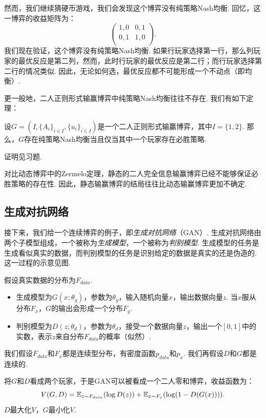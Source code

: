 然而，我们继续猜硬币游戏，我们会发现这个博弈没有纯策略Nash均衡. 回忆，这一博弈的收益矩阵为：
    \[
    \begin{pmatrix}
    1,0&0,1\\
    0,1&1,0\\
    \end{pmatrix}.
    \]
我们现在验证，这个博弈没有纯策略Nash均衡. 如果行玩家选择第一行，那么列玩家的最优反应是第二列，然而，此时行玩家的最优反应是第二行；而行玩家选择第二行的情况类似. 因此，无论如何选，最优反应都不可能形成一个不动点（即均衡）.

更一般地，二人正则形式输赢博弈中纯策略Nash均衡往往不存在. 我们有如下定理：
\begin{theorem}
设$G=(I,\{A_i\}_{i\in I}, \{u_i\}_{i\in I})$是一个二人正则形式输赢博弈，其中$I=\{1,2\}$. 那么，$G$存在纯策略Nash均衡当且仅当其中一个玩家存在必胜策略. %
\end{theorem}
证明见习题.

对比动态博弈中的Zermelo定理，静态的二人完全信息输赢博弈已经不能够保证必胜策略的存在性. 因此，静态输赢博弈的结局往往比动态输赢博弈更加不确定.


\subsection{生成对抗网络}

接下来，我们给一个连续博弈的例子，即\textit{生成对抗网络}（GAN）. 生成对抗网络由两个子模型组成，一个被称为\textit{生成模型}，一个被称为\textit{判别模型}. 生成模型的任务是生成看似真实的数据，而判别模型的任务是识别给定的数据是真实的还是伪造的. 这一过程的示意见图.

假设真实数据的分布为$F_{data}$. 
\begin{itemize}
    \item 生成模型为$G(x;\theta_g)$，参数为$\theta_g$，输入随机向量$x$，输出数据向量$z$. 当$x$服从分布$F_x$，$G$的输出会形成一个分布$F_g$. 
    \item 判别模型为$D(z;\theta_d)$，参数为$\theta_d$，接受一个数据向量$z$，输出一个$[0,1]$中的实数，表示$z$来自分布$F_{data}$的概率（似然）.
\end{itemize}
我们假设$F_{data}$和$F_x$都是连续型分布，有密度函数$p_{data}$和$p_x$. 我们再假设$D$和$G$都是连续的.

将$G$和$D$看成两个玩家，于是GAN可以被看成一个二人零和博弈，收益函数为：
    \[
        V(G,D)=\mathbb{E}_{z\sim F_{data}}(\log D(z))+\mathbb{E}_{x\sim F_x}(\log(1-D(G(x)))).
    \]
$D$最大化$V$，$G$最小化$V$.

